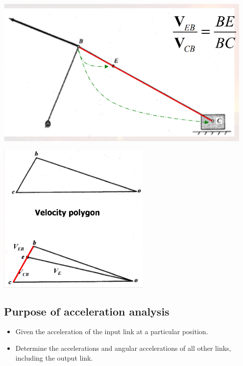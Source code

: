 \documentclass[11pt]{article}
\begin{document}
\begin{center}
\includegraphics[height=20em]{./images/velocity-image-of-collinear-points-mechanism.png}
\end{center}

\begin{center}
\includegraphics[height=20em]{./images/velocity-image-of-collinear-points-polygon.png}
\end{center}
\subsection{Purpose of acceleration analysis}
\label{sec:org22485f0}
\begin{itemize}
\item Given the acceleration of the input link at a particular position.
\item Determine the accelerations and angular accelerations of all other links, including the output link.
\end{itemize}
\end{document}
